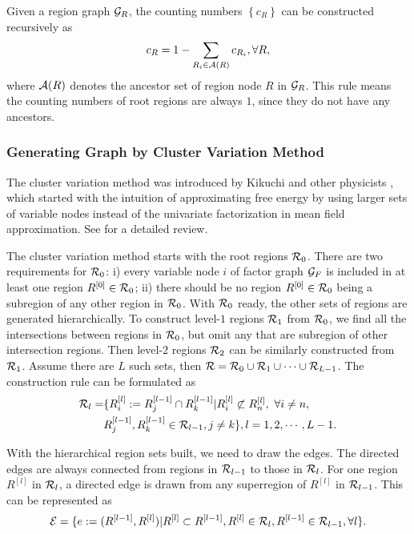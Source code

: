 Given a region graph $\mathcal{G}_R$, the counting numbers $\left\{ c_R \right\}$ can be constructed recursively as
\begin{equation}
  c_R = 1 - \sum_{R_i \in \mathcal{A}(R)} c_{R_i}, \forall R,
\end{equation}
where $\mathcal{A}(R)$ denotes the ancestor set of region node $R$ in $\mathcal{G}_R$. This rule means the counting numbers of root regions are always $1$, since they do not have any ancestors.


\subsubsection{Generating Graph by Cluster Variation Method}
\label{sec:cluster-variation-method}

The cluster variation method was introduced by Kikuchi and other physicists \cite{PhysRev.81.988,morita1991cluster}, which started with the intuition of approximating free energy by using larger sets of variable nodes instead of the univariate factorization in mean field approximation. See \cite{pelizzola2005cvm} for a detailed review.

The cluster variation method starts with the root regions $\mathcal{R}_0$. There are two requirements for $\mathcal{R}_0$: i) every variable node $i$ of factor graph $\mathcal{G}_F$ is included in at least one region $R^{[0]}\in\mathcal{R}_0$; ii) there should be no region $R^{[0]}\in \mathcal{R}_0$ being a subregion of any other region in $\mathcal{R}_0$.
With $\mathcal{R}_0$ ready, the other sets of regions are generated hierarchically. To construct level-$1$ regions $\mathcal{R}_1$ from $\mathcal{R}_0$, we find all the intersections between regions in $\mathcal{R}_0$, but omit any that are subregion of other intersection regions. Then level-$2$ regions $\mathcal{R}_2$ can be similarly constructed from $\mathcal{R}_1$. Assume there are $L$ such sets, then $\mathcal{R} = \mathcal{R}_0 \cup \mathcal{R}_1 \cup \cdots \cup \mathcal{R}_{L-1}$. The construction rule can be formulated as
\begin{align}
  \mathcal{R}_l = &\{ R^{[l]}_i := R^{[l-1]}_j \cap R^{[l-1]}_k | R^{[l]}_i \not\subset R^{[l]}_n,~ \forall i \neq n, \nonumber \\
          &R^{[l-1]}_j, R^{[l-1]}_k \in \mathcal{R}_{l-1} , j\neq k\}, l=1, 2, \cdots, L-1.
\end{align}

With the hierarchical region sets built, we need to draw the edges. The directed edges are always connected from regions in $\mathcal{R}_{l-1}$ to those in $\mathcal{R}_{l}$. For one region $R^{[l]}$ in $\mathcal{R}_l$, a directed edge is drawn from any superregion of $R^{[l]}$ in $\mathcal{R}_{l-1}$. This can be represented as
\begin{align}
  \mathcal{E} = \{ e := (R^{[l-1]}, R^{[l]}) | R^{[l]} \subset R^{[l-1]}, R^{[l]} \in \mathcal{R}_l, R^{[l-1]} \in \mathcal{R}_{l-1} , \forall l\}.
\end{align}



